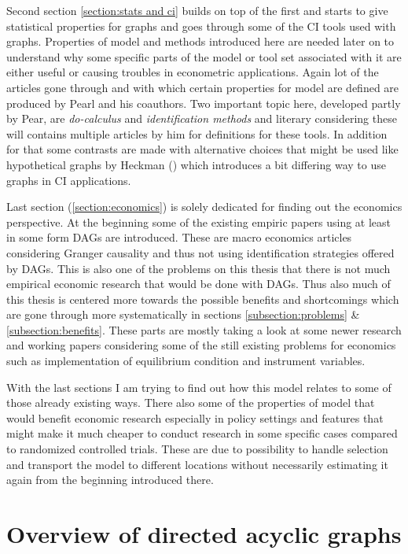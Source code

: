 \documentclass[main=english,12pt,a4paper,pdftex,econ,utf8]{aaltothesis}
\begin{document}
Second section \ref{section:stats and ci} builds on top of the first and starts to give statistical properties for graphs and goes through some of the CI tools used with graphs. Properties of model and methods introduced here are needed later on to understand why some specific parts of the model or tool set associated with it are either useful or causing troubles in econometric applications. Again lot of the articles gone through and with which certain properties for model are defined are produced by Pearl and his coauthors. Two important topic here, developed partly by Pear, are \textit{do-calculus} and \textit{identification methods} and literary considering these will contains multiple articles by him for definitions for these tools. In addition for that some contrasts are made with alternative choices that might be used like hypothetical graphs by Heckman (\cite{Heckman2015}) which introduces a bit differing way to use graphs in CI applications.

Last section (\ref{section:economics}) is solely dedicated for finding out the economics perspective. At the beginning some of the existing empiric papers using at least in some form DAGs are introduced. These are macro economics articles considering Granger causality and thus not using identification strategies offered by DAGs. This is also one of the problems on this thesis that there is not much empirical economic research that would be done with DAGs. Thus also much of this thesis is centered more towards the possible benefits and shortcomings which are gone through more systematically in sections \ref{subsection:problems} \& \ref{subsection:benefits}. These parts are mostly taking a look at some newer research and working papers considering some of the still existing problems for economics such as implementation of equilibrium condition and instrument variables.

With the last sections I am trying to find out how this model relates to some of those already existing ways. There also some of the properties of model that would benefit economic research especially in policy settings and features that might make it much cheaper to conduct research in some specific cases compared to randomized controlled trials. These are due to possibility to handle selection and transport the model to different locations without necessarily estimating it again from the beginning introduced there.

\clearpage

\section{Overview of directed acyclic graphs} \label{section:overview}
\end{document}
